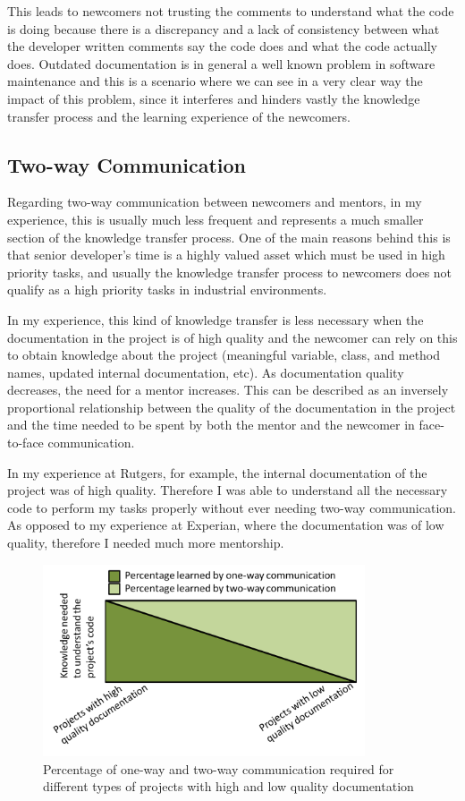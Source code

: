 \documentclass[12pt, letterpaper]{article}
\begin{document}
This leads to newcomers not 
trusting the comments to understand what the code is doing because there is a discrepancy and a lack of 
consistency between what the developer written comments say the code does and what the code actually does. 
Outdated documentation is in general a well known problem in software maintenance and this is a scenario
where we can see in a very clear way the impact of this problem, since it interferes and hinders vastly the 
knowledge transfer process and the learning experience of the newcomers.


\subsection{Two-way Communication}
Regarding two-way communication between newcomers and mentors, in my experience, this is usually much less frequent and
represents a much smaller section of the knowledge transfer process. One of the main reasons behind this is that
senior developer's time is a highly valued asset which must be used in high priority tasks, and usually
the knowledge transfer process to newcomers does not qualify as a high priority tasks in industrial environments. 

In my experience, this kind of knowledge transfer is less necessary when the documentation in the project is of high
quality and the newcomer can rely on this to obtain knowledge about the project (meaningful variable, class, and 
method names, updated internal documentation, etc). As documentation quality decreases, the need for a mentor increases. This can be described
as an inversely proportional relationship between the quality of the documentation in the project and the 
time needed to be spent by both the mentor and the newcomer in face-to-face communication.


In my experience at Rutgers, for example, the internal documentation of the project was of high quality. Therefore
I was able to understand all the necessary code to perform my tasks properly without ever needing two-way 
communication. As opposed to my experience at Experian, where the documentation was of low quality, therefore
I needed much more mentorship.


\begin{figure}[h]
    \centering
    \includegraphics[width=0.85\textwidth]{Graph1}
    \caption{Percentage of one-way and two-way communication required for different types of projects with high and low quality documentation}
    \label{graph1}
\end{figure}
\end{document}
